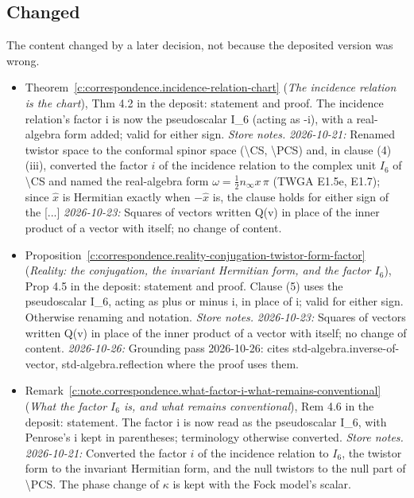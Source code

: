 \documentclass[11pt]{article}
\theoremstyle{definition}
\theoremstyle{plain}
\begin{document}
\subsection*{Changed}
The content changed by a later decision, not because the deposited version was wrong.
\begin{itemize}\setlength{\itemsep}{2pt}
\item Theorem~\ref{c:correspondence.incidence-relation-chart} (\emph{The incidence relation is the chart}), Thm 4.2 in the deposit: statement and proof. The incidence relation's factor i is now the pseudoscalar I\_6 (acting as -i), with a real-algebra form added; valid for either sign. \emph{Store notes.} \emph{2026-10-21:} Renamed twistor space to the conformal spinor space (\textbackslash{}CS, \textbackslash{}PCS) and, in clause (4)(iii), converted the factor $i$ of the incidence relation to the complex unit $I_6$ of \textbackslash{}CS and named the real-algebra form $\omega = \tfrac12 n_\infty x\,\pi$ (TWGA E1.5e, E1.7); since $\hat x$ is Hermitian exactly when $-\hat x$ is, the clause holds for either sign of the [...] \emph{2026-10-23:} Squares of vectors written Q(v) in place of the inner product of a vector with itself; no change of content.
\item Proposition~\ref{c:correspondence.reality-conjugation-twistor-form-factor} (\emph{Reality: the conjugation, the invariant Hermitian form, and the factor $I_6$}), Prop 4.5 in the deposit: statement and proof. Clause (5) uses the pseudoscalar I\_6, acting as plus or minus i, in place of i; valid for either sign. Otherwise renaming and notation. \emph{Store notes.} \emph{2026-10-23:} Squares of vectors written Q(v) in place of the inner product of a vector with itself; no change of content. \emph{2026-10-26:} Grounding pass 2026-10-26: cites std-algebra.inverse-of-vector, std-algebra.reflection where the proof uses them.
\item Remark~\ref{c:note.correspondence.what-factor-i-what-remains-conventional} (\emph{What the factor $I_6$ is, and what remains conventional}), Rem 4.6 in the deposit: statement. The factor i is now read as the pseudoscalar I\_6, with Penrose's i kept in parentheses; terminology otherwise converted. \emph{Store notes.} \emph{2026-10-21:} Converted the factor $i$ of the incidence relation to $I_6$, the twistor form to the invariant Hermitian form, and the null twistors to the null part of \textbackslash{}PCS. The phase change of $\kappa$ is kept with the Fock model's scalar.

\end{itemize}
\end{document}
